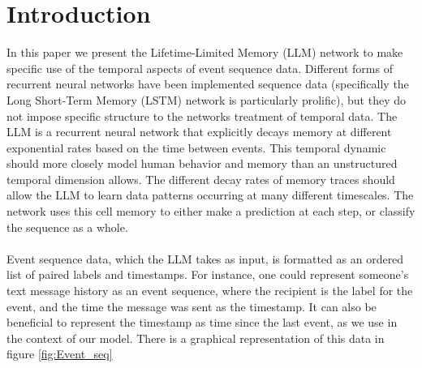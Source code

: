 \chapter{Introduction}
\label{introchap}
In this paper we present the Lifetime-Limited Memory (LLM) network to make specific use of the temporal aspects of event sequence data. Different forms of recurrent neural networks have been implemented sequence data (specifically the Long Short-Term Memory (LSTM)\cite{LSTM} network is particularly prolific), but they do not impose specific structure to the networks treatment of temporal data. The LLM is a recurrent neural network that explicitly decays memory at different exponential rates based on the time between events. This temporal dynamic should more closely model human behavior and memory than an unstructured temporal dimension allows. The different decay rates of memory traces should allow the LLM to learn data patterns occurring at many different timescales. The network uses this cell memory to either make a prediction at each step, or classify the sequence as a whole. 
\\\\
Event sequence data, which the LLM takes as input, is formatted as an ordered list of paired labels and timestamps. For instance, one could represent someone's text message history as an event sequence, where the recipient is the label for the event, and the time the message was sent as the timestamp. It can also be beneficial to represent the timestamp as time since the last event, as we use in the context of our model. There is a graphical representation of this data in figure \ref{fig:Event_seq}

